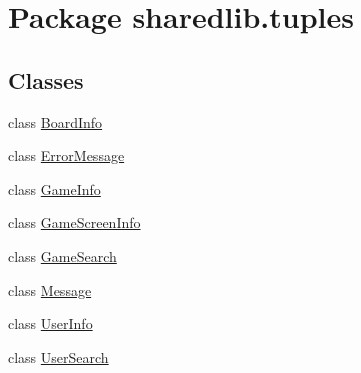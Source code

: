 \hypertarget{namespacesharedlib_1_1tuples}{}\section{Package sharedlib.\+tuples}
\label{namespacesharedlib_1_1tuples}
\subsection*{Classes}
\begin{DoxyCompactItemize}
\item 
class \hyperlink{classsharedlib_1_1tuples_1_1_board_info}{Board\+Info}
\item 
class \hyperlink{classsharedlib_1_1tuples_1_1_error_message}{Error\+Message}
\item 
class \hyperlink{classsharedlib_1_1tuples_1_1_game_info}{Game\+Info}
\item 
class \hyperlink{classsharedlib_1_1tuples_1_1_game_screen_info}{Game\+Screen\+Info}
\item 
class \hyperlink{classsharedlib_1_1tuples_1_1_game_search}{Game\+Search}
\item 
class \hyperlink{classsharedlib_1_1tuples_1_1_message}{Message}
\item 
class \hyperlink{classsharedlib_1_1tuples_1_1_user_info}{User\+Info}
\item 
class \hyperlink{classsharedlib_1_1tuples_1_1_user_search}{User\+Search}
\end{DoxyCompactItemize}
